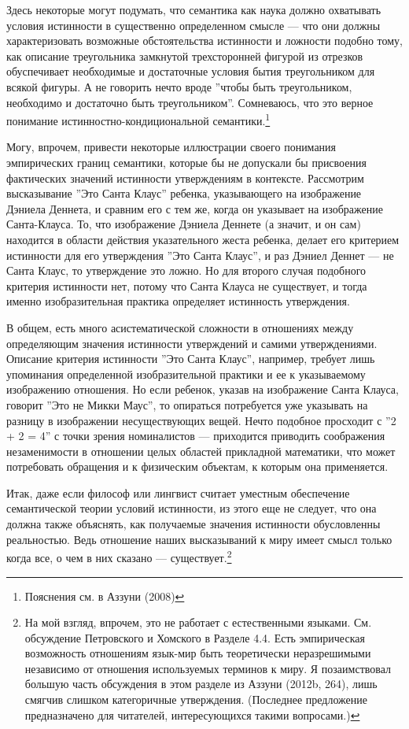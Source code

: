 \documentclass[11pt]{book}
\begin{document}
Здесь некоторые могут подумать, что семантика как наука должно охватывать условия истинности в существенно определенном смысле --- что они должны характеризовать возможные обстоятельства истинности и ложности подобно тому, как описание треугольника замкнутой трехсторонней фигурой из отрезков обуспечивает необходимые и достаточные условия бытия треугольником для всякой фигуры. А не говорить нечто вроде ''чтобы быть треугольником, необходимо и достаточно быть треугольником''. Сомневаюсь, что это верное понимание истинностно-кондициональной семантики.\footnote{Пояснения см. в Аззуни (2008)}

Могу, впрочем, привести некоторые иллюстрации своего понимания эмпирических границ семантики, которые бы не допускали бы присвоения фактических значений истинности утверждениям в контексте. Рассмотрим высказывание ''Это Санта Клаус'' ребенка, указывающего на изображение Дэниела Деннета, и сравним его с тем же, когда он указывает на изображение Санта-Клауса. То, что изображение Дэниела Деннете (а значит, и он сам) находится в области действия указательного жеста ребенка, делает его критерием истинности для его утверждения ''Это Санта Клаус'', и раз Дэниел Деннет --- не Санта Клаус, то утверждение это ложно. Но для второго случая подобного критерия истинности нет, потому что Санта Клауса не существует, и тогда именно изобразительная практика определяет истинность утверждения.

В общем, есть много асистематической сложности в отношениях между определяющим значения истинности утверждений и самими утверждениями. Описание критерия истинности ''Это Санта Клаус'', например, требует лишь упоминания определенной изобразительной практики и ее к указываемому изображению отношения. Но если ребенок, указав на изображение Санта Клауса, говорит ''Это не Микки Маус'', то опираться потребуется уже указывать на разницу в изображении несуществующих вещей. Нечто подобное просходит с ''2 + 2 = 4'' с точки зрения номиналистов --- приходится приводить соображения незаменимости в отношении целых областей прикладной математики, что может потребовать обращения и к физическим объектам, к которым она применяется.

Итак, даже если философ или лингвист считает уместным обеспечение семантической теории условий истинности, из этого еще не следует, что она должна также объяснять, как получаемые значения истинности обусловленны реальностью. Ведь отношение наших высказываний к миру имеет смысл только когда все, о чем в них сказано --- существует.\footnote{На мой взгляд, впрочем, это не работает с естественными языками. См. обсуждение Петровского и Хомского в Разделе 4.4. Есть эмпирическая возможность отношениям язык-мир быть теоретически неразрешимыми независимо от отношения используемых терминов к миру. Я позаимствовал большую часть обсуждения в этом разделе из Аззуни (2012b, 264), лишь смягчив слишком категоричные утверждения. (Последнее предложение предназначено для читателей, интересующихся такими вопросами.)}
\end{document}
